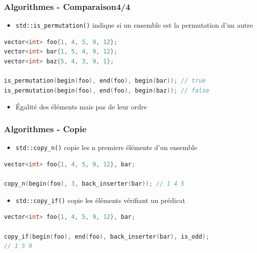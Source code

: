 \documentclass[C++.tex]{subfiles}
\begin{document}
\begin{frame}[fragile]
	\frametitle{Algorithmes - Comparaison\titlehfill{}4/4}
	\begin{itemize}
		\item \lstinline|std::is_permutation()| indique si un ensemble est la permutation d'un autre
	\end{itemize}

	\begin{lstlisting}[language=C++]
vector<int> foo{1, 4, 5, 9, 12};
vector<int> bar{1, 5, 4, 9, 12};
vector<int> baz{5, 4, 3, 9, 1};

is_permutation(begin(foo), end(foo), begin(bar)); // true
is_permutation(begin(foo), end(foo), begin(baz)); // false\end{lstlisting}

	\begin{itemize}
		\item Égalité des éléments mais pas de leur ordre
	\end{itemize}
\end{frame}

\begin{frame}[fragile]
	\frametitle{Algorithmes - Copie}
	\begin{itemize}
		\item \lstinline|std::copy_n()| copie les n premiers éléments d'un ensemble
	\end{itemize}

	\begin{lstlisting}[language=C++]
vector<int> foo{1, 4, 5, 9, 12}, bar;

copy_n(begin(foo), 3, back_inserter(bar)); // 1 4 5\end{lstlisting}

	\begin{itemize}
		\item \lstinline|std::copy_if()| copie les éléments vérifiant un prédicat
	\end{itemize}

	\begin{lstlisting}[language=C++]
vector<int> foo{1, 4, 5, 9, 12}, bar;

copy_if(begin(foo), end(foo), back_inserter(bar), is_odd);
// 1 5 9\end{lstlisting}
\end{frame}
\end{document}
